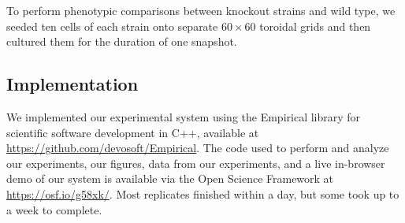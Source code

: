 To perform phenotypic comparisons between knockout strains and wild type, we seeded ten cells of each strain onto separate $60 \times 60$ toroidal grids and then cultured them for the duration of one snapshot.

\subsection{Implementation}

We implemented our experimental system using the Empirical library for scientific software development in C++, available at \url{https://github.com/devosoft/Empirical}.
The code used to perform and analyze our experiments, our figures, data from our experiments, and a live in-browser demo of our system is available via the Open Science Framework at \url{https://osf.io/g58xk/}.
Most replicates finished within a day, but some took up to a week to complete.
